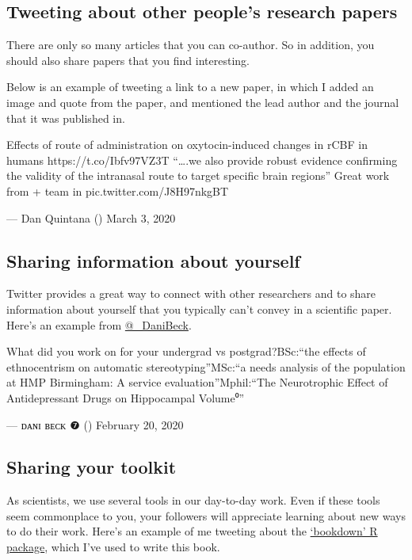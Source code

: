 \documentclass[]{book}
\begin{document}
\hypertarget{tweeting-about-other-peoples-research-papers}{%
\subsection{Tweeting about other people's research papers}\label{tweeting-about-other-peoples-research-papers}}

There are only so many articles that you can co-author. So in addition, you should also share papers that you find interesting.

Below is an example of tweeting a link to a new paper, in which I added an image and quote from the paper, and mentioned the lead author and the journal that it was published in.

Effects of route of administration on oxytocin-induced changes in rCBF in humans https://t.co/Ibfv97VZ3T ``\ldots{}.we also provide robust evidence confirming the validity of the intranasal route to target specific brain regions'' Great work from \citet{DanielArturAM} + team in \citet{NatureComms} pic.twitter.com/J8H97nkgBT

--- Dan Quintana (\citet{dsquintana}) March 3, 2020

\hypertarget{sharing-information-about-yourself}{%
\subsection{Sharing information about yourself}\label{sharing-information-about-yourself}}

Twitter provides a great way to connect with other researchers and to share information about yourself that you typically can't convey in a scientific paper. Here's an example from \href{https://twitter.com/_DaniBeck}{@\_DaniBeck}.

What did you work on for your undergrad vs postgrad?BSc:``the effects of ethnocentrism on automatic stereotyping''MSc:``a needs analysis of the population at HMP Birmingham: A service evaluation''Mphil:``The Neurotrophic Effect of Antidepressant Drugs on Hippocampal Volume⁰''

--- ᴅᴀɴɪ ʙᴇᴄᴋ ❼ (\citet{_DaniBeck}) February 20, 2020

\hypertarget{sharing-your-toolkit}{%
\subsection{Sharing your toolkit}\label{sharing-your-toolkit}}

As scientists, we use several tools in our day-to-day work. Even if these tools seem commonplace to you, your followers will appreciate learning about new ways to do their work. Here's an example of me tweeting about the \href{https://bookdown.org/home/}{`bookdown' R package}, which I've used to write this book.
\end{document}
